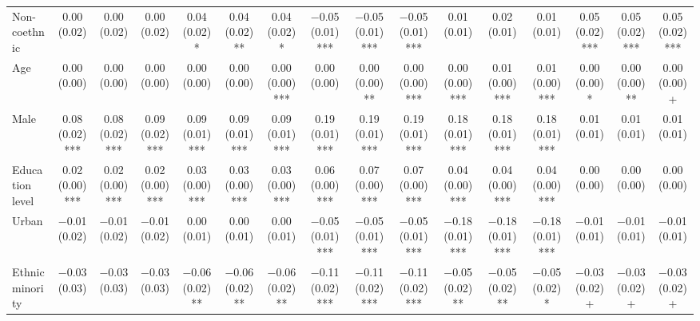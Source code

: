 \begin{table}[H]
\begin{tabular}[t]{lccccccccccccccc}
Non-coethnic & \num{0.00} (\num{0.02}) & \num{0.00} (\num{0.02}) & \num{0.00} (\num{0.02}) & \num{0.04} (\num{0.02})* & \num{0.04} (\num{0.02})** & \num{0.04} (\num{0.02})* & \num{-0.05} (\num{0.01})*** & \num{-0.05} (\num{0.01})*** & \num{-0.05} (\num{0.01})*** & \num{0.01} (\num{0.01}) & \num{0.02} (\num{0.01}) & \num{0.01} (\num{0.01}) & \num{0.05} (\num{0.02})*** & \num{0.05} (\num{0.02})*** & \num{0.05} (\num{0.02})***\\
Age & \num{0.00} (\num{0.00}) & \num{0.00} (\num{0.00}) & \num{0.00} (\num{0.00}) & \num{0.00} (\num{0.00}) & \num{0.00} (\num{0.00}) & \num{0.00} (\num{0.00})*** & \num{0.00} (\num{0.00}) & \num{0.00} (\num{0.00})** & \num{0.00} (\num{0.00})*** & \num{0.00} (\num{0.00})*** & \num{0.01} (\num{0.00})*** & \num{0.01} (\num{0.00})*** & \num{0.00} (\num{0.00})* & \num{0.00} (\num{0.00})** & \num{0.00} (\num{0.00})+\\
Male & \num{0.08} (\num{0.02})*** & \num{0.08} (\num{0.02})*** & \num{0.09} (\num{0.02})*** & \num{0.09} (\num{0.01})*** & \num{0.09} (\num{0.01})*** & \num{0.09} (\num{0.01})*** & \num{0.19} (\num{0.01})*** & \num{0.19} (\num{0.01})*** & \num{0.19} (\num{0.01})*** & \num{0.18} (\num{0.01})*** & \num{0.18} (\num{0.01})*** & \num{0.18} (\num{0.01})*** & \num{0.01} (\num{0.01}) & \num{0.01} (\num{0.01}) & \num{0.01} (\num{0.01})\\
Education level & \num{0.02} (\num{0.00})*** & \num{0.02} (\num{0.00})*** & \num{0.02} (\num{0.00})*** & \num{0.03} (\num{0.00})*** & \num{0.03} (\num{0.00})*** & \num{0.03} (\num{0.00})*** & \num{0.06} (\num{0.00})*** & \num{0.07} (\num{0.00})*** & \num{0.07} (\num{0.00})*** & \num{0.04} (\num{0.00})*** & \num{0.04} (\num{0.00})*** & \num{0.04} (\num{0.00})*** & \num{0.00} (\num{0.00}) & \num{0.00} (\num{0.00}) & \num{0.00} (\num{0.00})\\
Urban & \num{-0.01} (\num{0.02}) & \num{-0.01} (\num{0.02}) & \num{-0.01} (\num{0.02}) & \num{0.00} (\num{0.01}) & \num{0.00} (\num{0.01}) & \num{0.00} (\num{0.01}) & \num{-0.05} (\num{0.01})*** & \num{-0.05} (\num{0.01})*** & \num{-0.05} (\num{0.01})*** & \num{-0.18} (\num{0.01})*** & \num{-0.18} (\num{0.01})*** & \num{-0.18} (\num{0.01})*** & \num{-0.01} (\num{0.01}) & \num{-0.01} (\num{0.01}) & \num{-0.01} (\num{0.01})\\
Ethnic minority & \num{-0.03} (\num{0.03}) & \num{-0.03} (\num{0.03}) & \num{-0.03} (\num{0.03}) & \num{-0.06} (\num{0.02})** & \num{-0.06} (\num{0.02})** & \num{-0.06} (\num{0.02})** & \num{-0.11} (\num{0.02})*** & \num{-0.11} (\num{0.02})*** & \num{-0.11} (\num{0.02})*** & \num{-0.05} (\num{0.02})** & \num{-0.05} (\num{0.02})** & \num{-0.05} (\num{0.02})* & \num{-0.03} (\num{0.02})+ & \num{-0.03} (\num{0.02})+ & \num{-0.03} (\num{0.02})+\\

\end{tabular}
\end{table}

